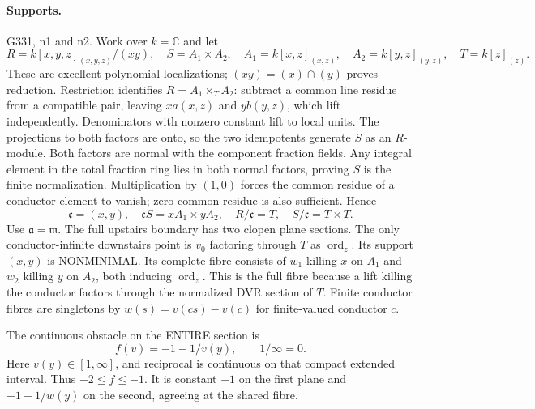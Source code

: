 \paragraph{Supports.} G331, n1 and n2.
Work over $k=\mathbb C$ and let
\[
 R=k[x,y,z]_{(x,y,z)}/(xy),\quad S=A_1\times A_2,
 \quad A_1=k[x,z]_{(x,z)},\quad A_2=k[y,z]_{(y,z)},\quad T=k[z]_{(z)}.
\]
These are excellent polynomial localizations; $(xy)=(x)\cap(y)$ proves reduction. Restriction identifies $R=A_1\times_T A_2$: subtract a common line residue from a compatible pair, leaving $xa(x,z)$ and $yb(y,z)$, which lift independently. Denominators with nonzero constant lift to local units. The projections to both factors are onto, so the two idempotents generate $S$ as an $R$-module. Both factors are normal with the component fraction fields. Any integral element in the total fraction ring lies in both normal factors, proving $S$ is the finite normalization. Multiplication by $(1,0)$ forces the common residue of a conductor element to vanish; zero common residue is also sufficient. Hence
\[
 \mathfrak c=(x,y),\quad \mathfrak cS=xA_1\times yA_2,
 \quad R/\mathfrak c=T,\quad S/\mathfrak c=T\times T.
\]
Use $\mathfrak a=\mathfrak m$. The full upstairs boundary has two clopen plane sections. The only conductor-infinite downstairs point is $v_0$ factoring through $T$ as $\operatorname{ord}_z$. Its support $(x,y)$ is NONMINIMAL. Its complete fibre consists of $w_1$ killing $x$ on $A_1$ and $w_2$ killing $y$ on $A_2$, both inducing $\operatorname{ord}_z$. This is the full fibre because a lift killing the conductor factors through the normalized DVR section of $T$. Finite conductor fibres are singletons by $w(s)=v(cs)-v(c)$ for finite-valued conductor $c$.

The continuous obstacle on the ENTIRE section is
\[
 f(v)=-1-1/v(y),\qquad 1/\infty=0.
\]
Here $v(y)\in[1,\infty]$, and reciprocal is continuous on that compact extended interval. Thus $-2\le f\le-1$. It is constant $-1$ on the first plane and $-1-1/w(y)$ on the second, agreeing at the shared fibre.

